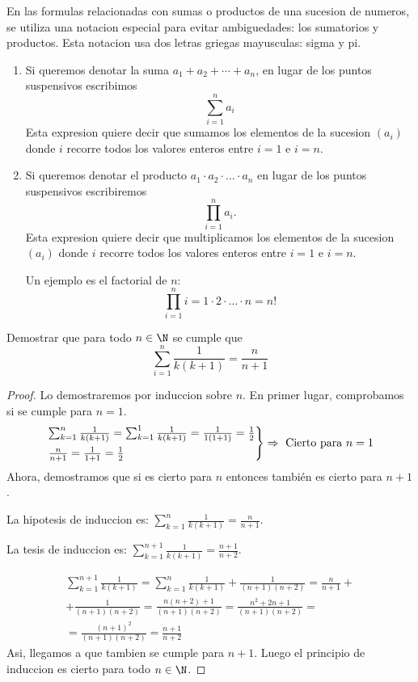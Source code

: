 \begin{definition}
	En las formulas relacionadas con sumas o productos de una sucesion de numeros, se utiliza una notacion especial para evitar ambiguedades: los sumatorios y productos. Esta notacion usa dos letras griegas mayusculas: sigma y pi.
\end{definition}
\begin{enumerate}
	\item Si queremos denotar la suma \(a_1 + a_2 + \cdots + a_n \), en lugar de los puntos suspensivos escribimos
	      \[
		      \sum_{i=1}^{n} a_i
	      \]
	      Esta expresion quiere decir que sumamos los elementos de la sucesion \((a_i )\) donde \(i \) recorre todos los valores enteros entre \(i = 1 \) e \(i = n \).
	\item Si queremos denotar el producto \(a_1 \cdot a_2 \cdot \ldots \cdot  a_n \) en lugar de los puntos suspensivos escribiremos
	      \[
		      \prod\limits_{i=1}^{n } a_i.
	      \]
	      Esta expresion quiere decir que multiplicamos los elementos de la sucesion \((a_i )\) donde \(i \) recorre todos los valores enteros entre \(i = 1\) e \(i = n \).

	      Un ejemplo es el factorial de \( n \):
	      \[
		      \prod\limits_{i =1}^{n} i = 1 \cdot 2 \cdot \ldots \cdot n = n!
	      \]
\end{enumerate}

\begin{example}
	Demostrar que para todo \(n \in  \N \) se cumple que
	\[
		\sum_{i=1}^{n} \frac{1}{k(k+1)} = \frac{n}{n+1}
	\]
\end{example}
\begin{proof}
	Lo demostraremos por induccion sobre \(n \). En primer lugar, comprobamos si se cumple para \(n = 1 \).
	\[
		\begin{rcases}
			\sum_{k =1}^{n } \frac{1}{k(k+1)} = \sum_{k=1}^{1} \frac{1}{k(k+1)} =\frac{1}{1(1+1)} = \frac{1}{2} \\
			\frac{n }{n+1 } = \frac{1}{1+1} = \frac{1}{2}
		\end{rcases} \Rightarrow \text{ Cierto para } n = 1
	\]
	Ahora, demostramos que si es cierto para \(n \) entonces también es cierto para \(n + 1 \).

	La hipotesis de induccion es: \(\displaystyle \sum_{k=1}^{n} \frac{1}{k(k+1)} = \frac{n}{n+1}\).

	La tesis de induccion es: \(\displaystyle \sum_{k=1}^{n+1} \frac{1}{k(k+1)}  = \frac{n+1}{n+2} \).

	\begin{multline*}
		\sum_{k=1}^{n+1} \frac{1}{k(k+1)} = \sum_{k=1}^{n } \frac{1}{k(k+1 )} + \frac{1}{(n+1)(n+2)} = \frac{n }{n+1 } + \\ +  \frac{1}{(n+1)(n+2)}
		= \frac{n(n+2) + 1 }{(n+1)(n+2)} = \frac{n^{2} + 2n + 1 }{(n+1)(n+2)} = \\  = \frac{(n+1)^{2}}{(n+1)(n+2)} = \frac{n + 1}{n + 2}
	\end{multline*}
	Asi, llegamos a que tambien se cumple para \(n+ 1\). Luego el principio de induccion es cierto para todo \( n \in  \N \).
\end{proof}

